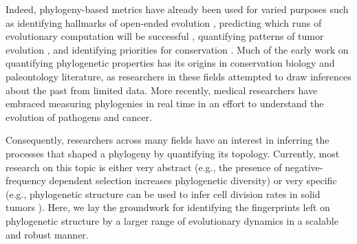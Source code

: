 Indeed, phylogeny-based metrics have already been used for varied purposes such as identifying hallmarks of open-ended evolution \citep{dolsonMODESToolboxMeasurements2019}, predicting which runs of evolutionary computation will be successful \citep{hernandezWhatCanPhylogenetic2022a,shahbandeganUntanglingPhylogeneticDiversity2022a}, quantifying patterns of tumor evolution \citep{scottInferringTumorProliferative2020,lewinsohnStatedependentEvolutionaryModels2023}, and identifying priorities for conservation \citep{forestPreservingEvolutionaryPotential2007}.
Much of the early work on quantifying phylogenetic properties has its origins in conservation biology and paleontology literature, as researchers in these fields attempted to draw inferences about the past from limited data.
More recently, medical researchers have embraced measuring phylogenies in real time in an effort to understand the evolution of pathogens and cancer.

Consequently, researchers across many fields have an interest in inferring the processes that shaped a phylogeny by quantifying its topology.
Currently, most research on this topic is either very abstract (e.g., the presence of negative-frequency dependent selection increases phylogenetic diversity) or very specific (e.g., phylogenetic structure can be used to infer cell division rates in solid tumors \citep{lewinsohnStatedependentEvolutionaryModels2023}).
Here, we lay the groundwork for identifying the fingerprints left on phylogenetic structure by a larger range of evolutionary dynamics in a scalable and robust manner.


